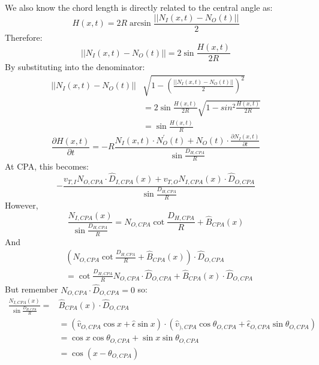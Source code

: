 We also know the chord length is directly related to the central angle as:
\begin{equation}
    H(x,t) = 2R\arcsin{\frac{|| N_{I}(x,t) - N_{O}(t) ||}{2}}
\end{equation}
Therefore:
\begin{equation}
    ||N_{I}(x,t) - N_{O}(t)|| = 2\sin{\frac{H(x,t)}{2R}}
\end{equation}
By substituting into the denominator:
\begin{equation}
    \begin{aligned}
        ||N_{I}(x,t)-N_{O}(t)||& \sqrt{1- \left( \frac{||N_{I}(x,t)-N_{O}(t)||}{2} \right)^{2}} \\
        &= 2\sin{\frac{H(x,t)}{2R}}\sqrt{1-sin{^{2}\frac{H(x,t)}{2R}}} \\
        &= \sin{\frac{H(x,t)}{R}}
    \end{aligned}
\end{equation}
\begin{equation}
    \frac{\partial H(x,t)}{\partial t} = -R \frac{N_{I}(x,t) \cdot N^{'}_{O}(t) + N_{O}(t) \cdot \frac{\partial N_{I}(x,t)}{\partial t}}{\sin{\frac{D_{H,CPA}}{R}}}
\end{equation}
At CPA, this becomes:
\begin{equation}
    -\frac{v_{T,I}N_{O,CPA} \cdot \hat{D}_{I,CPA}(x) + v_{T,O}N_{I,CPA}(x) \cdot \hat{D}_{O,CPA}}{\sin{\frac{D_{H,CPA}}{R}}}
\end{equation}
However,
\begin{equation}
    \frac{N_{I,CPA}(x)}{\sin{\frac{D_{H,CPA}}{R}}} = N_{O,CPA}\cot{\frac{D_{H,CPA}}{R}} + \hat{B}_{CPA}(x)
\end{equation}
And
\begin{equation}
    \begin{aligned}
        &\left( N_{O,CPA}\cot{\frac{D_{H,CPA}}{R}} + \hat{B}_{CPA}(x) \right) \cdot \hat{D}_{O,CPA} \\
        &= \cot{\frac{D_{H,CPA}}{R}} N_{O,CPA} \cdot \hat{D}_{O,CPA} + \hat{B}_{CPA}(x) \cdot \hat{D}_{O,CPA}
    \end{aligned}
\end{equation}
But remember \( N_{O,CPA} \cdot \hat{D}_{O,CPA} = 0 \) so:
\begin{equation}
    \begin{aligned}
        \frac{N_{I,CPA}(x)}{\sin{\frac{D_{H,CPA}}{R}}} = &\hat{B}_{CPA}(x) \cdot \hat{D}_{O,CPA} \\
        &= (\hat{v}_{O,CPA}\cos{x} + \hat{\epsilon}\sin{x}) \cdot (\hat{v}_{),CPA}\cos{\theta_{O,CPA}} + \hat{\epsilon}_{O,CPA}\sin{\theta_{O,CPA}}) \\
        &= \cos{x}\cos{\theta_{O,CPA}} + \sin{x}\sin{\theta_{O,CPA}} \\
        &= \cos{(x-\theta_{O,CPA})}
    \end{aligned}
\end{equation}
